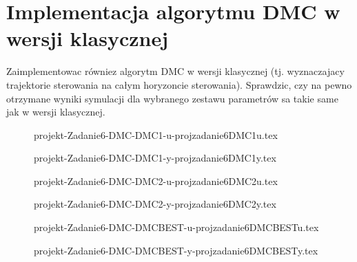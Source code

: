 \section{Implementacja algorytmu DMC w wersji klasycznej}
\label{projekt:zad6}

%    

Zaimplementowac równiez algorytm DMC w wersji klasycznej (tj. wyznaczajacy trajektorie
sterowania na całym horyzoncie sterowania). Sprawdzic, czy na pewno otrzymane
wyniki symulacji dla wybranego zestawu parametrów sa takie same jak w wersji
klasycznej.



\begin{figure}[H] 
    \centering
    
    \caption{projekt-Zadanie6-DMC-DMC1-u-projzadanie6DMC1u.tex}
    \label{projekt:zad6:figure:projzadanie6DMC1u}
\end{figure}

\begin{figure}[H] 
    \centering
    
    \caption{projekt-Zadanie6-DMC-DMC1-y-projzadanie6DMC1y.tex}
    \label{projekt:zad6:figure:projzadanie6DMC1y}
\end{figure}

\begin{figure}[H] 
    \centering
    
    \caption{projekt-Zadanie6-DMC-DMC2-u-projzadanie6DMC2u.tex}
    \label{projekt:zad6:figure:projzadanie6DMC2u}
\end{figure}

\begin{figure}[H] 
    \centering
    
    \caption{projekt-Zadanie6-DMC-DMC2-y-projzadanie6DMC2y.tex}
    \label{projekt:zad6:figure:projzadanie6DMC2y}
\end{figure}

\begin{figure}[H] 
    \centering
    
    \caption{projekt-Zadanie6-DMC-DMCBEST-u-projzadanie6DMCBESTu.tex}
    \label{projekt:zad6:figure:projzadanie6DMCBESTu}
\end{figure}

\begin{figure}[H] 
    \centering
    
    \caption{projekt-Zadanie6-DMC-DMCBEST-y-projzadanie6DMCBESTy.tex}
    \label{projekt:zad6:figure:projzadanie6DMCBESTy}
\end{figure}


\newpage
